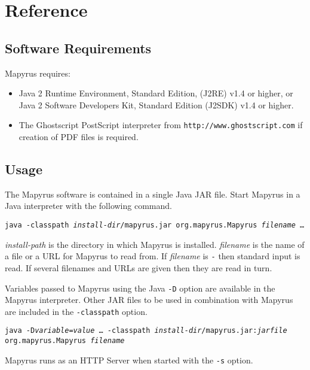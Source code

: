 
\section{Reference}

\subsection{Software Requirements}

Mapyrus requires:
\begin{itemize}
\item
Java 2 Runtime Environment, Standard Edition, (J2RE) v1.4 or higher,
or Java 2 Software Developers Kit, Standard Edition (J2SDK) v1.4 or higher.
\item
The Ghostscript PostScript interpreter from 
\texttt{http://www.ghostscript.com}
if creation of PDF files is required.
\end{itemize}

\subsection{Usage}

The Mapyrus software is contained in a single Java JAR file.
Start Mapyrus in a Java interpreter with the following command.

\vspace{10pt}
\texttt{java -classpath \textit{install-dir}/mapyrus.jar org.mapyrus.Mapyrus \textit{filename} \dots}
\vspace{10pt}

\textit{install-path} is the directory in which
Mapyrus is installed.  \textit{filename} is the name of a file
or a URL for Mapyrus to read from.  If \textit{filename} is \texttt{-}
then standard input is read.  If several filenames and URLs are
given then they are read in turn.

Variables passed to Mapyrus using the Java \texttt{-D} option
are available in the Mapyrus interpreter.  Other JAR files
to be used in combination with Mapyrus are included in the
\texttt{-classpath} option.

\vspace{10pt}
\texttt{java -D\textit{variable}=\textit{value} \dots\ -classpath \textit{install-dir}/mapyrus.jar:\textit{jarfile} org.mapyrus.Mapyrus \textit{filename}}
\vspace{10pt}

Mapyrus runs as an HTTP Server when started with the
\texttt{-s} option.

